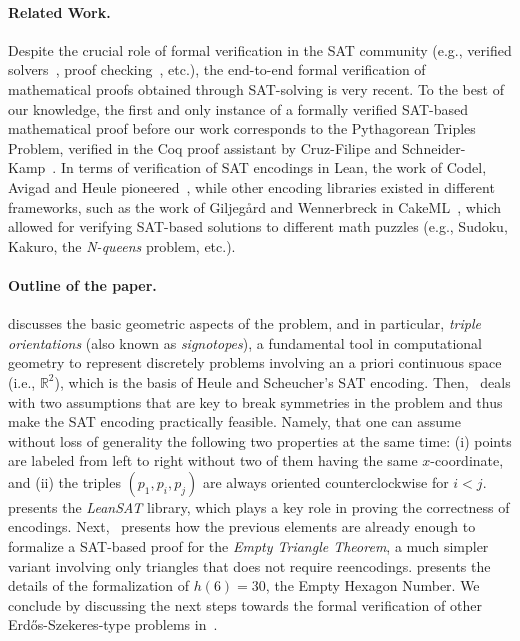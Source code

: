 \paragraph{Related Work.} Despite the crucial role of formal verification in the SAT community (e.g., verified solvers~\cite{oeVersatVerifiedModern2012,skotam_creusat_2022}, proof checking~\cite{lammichEfficientVerifiedSAT2020,tanVerifiedPropagationRedundancy2023}, etc.), the end-to-end formal verification of mathematical proofs obtained through SAT-solving is very recent. To the best of our knowledge, the first and only instance of a formally verified SAT-based mathematical proof before our work corresponds to the Pythagorean Triples Problem, verified in the \textsf{Coq} proof assistant by Cruz-Filipe and Schneider-Kamp~\cite{formalPythagoreanTriples,LPAR-21:Formally_Proving_Boolean_Pythagorean}. In terms of verification of SAT encodings in Lean, the work of Codel, Avigad and Heule pioneered~\cite{Cayden}, while other encoding libraries existed in different frameworks, such as the work of Giljeg\r{a}rd and Wennerbreck in \textsf{CakeML}~\cite{GilAndWennerbeck}, which allowed for verifying SAT-based solutions to different math puzzles (e.g., Sudoku, Kakuro, the \emph{N-queens} problem, etc.).

\paragraph{Outline of the paper.}  discusses the basic geometric aspects of the problem, and in particular, \emph{triple orientations} (also known as \emph{signotopes}), a fundamental tool in computational geometry to represent discretely problems involving an a priori continuous space (i.e., $\mathbb{R}^2$), which is the basis of Heule and Scheucher's SAT encoding. Then,~ deals with two assumptions that are key to break symmetries in the problem and thus make the SAT encoding practically feasible. Namely, that one can assume without loss of generality the following two properties at the same time: (i) points are labeled from left to right without two of them having the same $x$-coordinate, and (ii) the triples $(p_1, p_i, p_j)$ are always oriented counterclockwise for $i < j$. 
 presents the \emph{LeanSAT} library, which plays a key role in proving the correctness of encodings. Next,~ presents how the previous elements are already enough to formalize a SAT-based proof for the \emph{Empty Triangle Theorem}, a much simpler variant involving only triangles that does not require reencodings.  presents the details of the formalization of $h(6) = 30$, the Empty Hexagon Number. We conclude by discussing the next steps towards the formal verification of other Erd\H{o}s-Szekeres-type problems in~.
